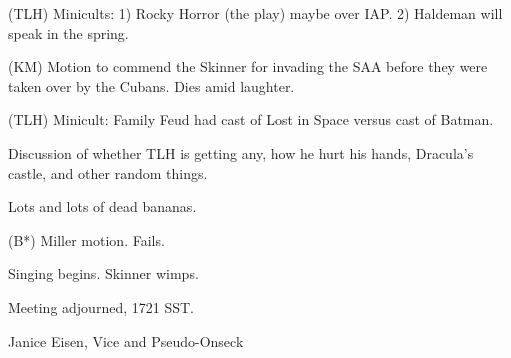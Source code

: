 \documentclass[12pt]{article}
\begin{document}
(TLH) Minicults: 1) Rocky Horror (the play) maybe over IAP. 2) Haldeman will speak in the spring.

(KM) Motion to commend the Skinner for invading the SAA before they were taken over by the Cubans. Dies amid laughter.

(TLH) Minicult: Family Feud had cast of Lost in Space versus cast of Batman.

Discussion of whether TLH is getting any, how he hurt his hands, Dracula's castle, and other random things.

Lots and lots of dead bananas.

(B*) Miller motion. Fails.

Singing begins. Skinner wimps.

\vspace{12pt}

\noindent
Meeting adjourned, 1721 SST.

\vspace{18pt}

\centerline{Janice Eisen, Vice and Pseudo-Onseck}
\end{document}
